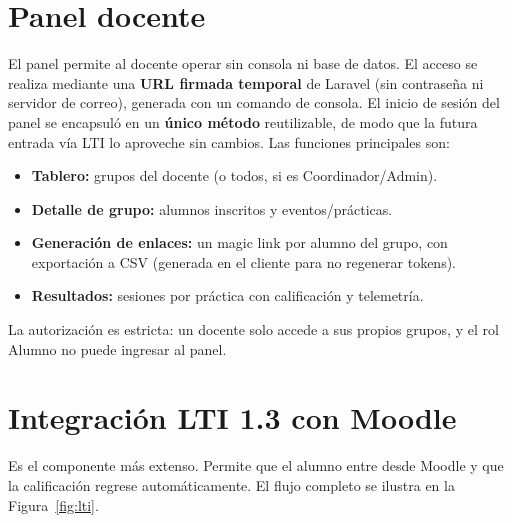 \documentclass[12pt,letterpaper,oneside]{report}
\begin{document}
\section{Panel docente}
El panel permite al docente operar sin consola ni base de datos. El acceso se
realiza mediante una \textbf{URL firmada temporal} de Laravel (sin contraseña ni
servidor de correo), generada con un comando de consola. El inicio de sesión del
panel se encapsuló en un \textbf{único método} reutilizable, de modo que la futura
entrada vía LTI lo aproveche sin cambios. Las funciones principales son:

\begin{itemize}[leftmargin=1.4em]
  \item \textbf{Tablero:} grupos del docente (o todos, si es Coordinador/Admin).
  \item \textbf{Detalle de grupo:} alumnos inscritos y eventos/prácticas.
  \item \textbf{Generación de enlaces:} un magic link por alumno del grupo, con
  exportación a CSV (generada en el cliente para no regenerar tokens).
  \item \textbf{Resultados:} sesiones por práctica con calificación y telemetría.
\end{itemize}

La autorización es estricta: un docente solo accede a sus propios grupos, y el
rol Alumno no puede ingresar al panel.

\section{Integración LTI 1.3 con Moodle}
Es el componente más extenso. Permite que el alumno entre desde Moodle y que la
calificación regrese automáticamente. El flujo completo se ilustra en la
Figura~\ref{fig:lti}.
\end{document}
